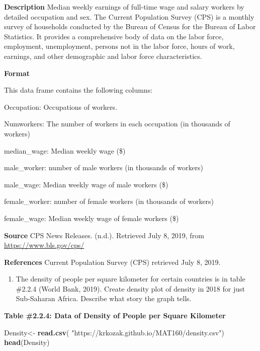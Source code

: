 \documentclass[
]{book}
\newenvironment{Shaded}{\begin{snugshade}}{\end{snugshade}}
\newcommand{\KeywordTok}[1]{\textcolor[rgb]{0.13,0.29,0.53}{\textbf{#1}}}
\newcommand{\NormalTok}[1]{#1}
\newcommand{\StringTok}[1]{\textcolor[rgb]{0.31,0.60,0.02}{#1}}
\providecommand{\tightlist}{%
  \setlength{\itemsep}{0pt}\setlength{\parskip}{0pt}}
\begin{document}
\textbf{Description}
Median weekly earnings of full-time wage and salary workers by detailed occupation and sex. The Current Population Survey (CPS) is a monthly survey of households conducted by the Bureau of Census for the Bureau of Labor Statistics. It provides a comprehensive body of data on the labor force, employment, unemployment, persons not in the labor force, hours of work, earnings, and other demographic and labor force characteristics.

\textbf{Format}

This data frame contains the following columns:

Occupation: Occupations of workers.

Numworkers: The number of workers in each occupation (in thousands of workers)

median\_wage: Median weekly wage (\$)

male\_worker: number of male workers (in thousands of workers)

male\_wage: Median weekly wage of male workers (\$)

female\_worker: number of female workers (in thousands of workers)

female\_wage: Median weekly wage of female workers (\$)

\textbf{Source}
CPS News Releases. (n.d.). Retrieved July 8, 2019, from \url{https://www.bls.gov/cps/}

\textbf{References}
Current Population Survey (CPS) retrieved July 8, 2019.

\begin{enumerate}
\def\labelenumi{\arabic{enumi}.}
\setcounter{enumi}{1}
\tightlist
\item
  The density of people per square kilometer for certain countries is in table \#2.2.4 (World Bank, 2019). Create density plot of density in 2018 for just Sub-Saharan Africa. Describe what story the graph tells.
\end{enumerate}

\textbf{Table \#2.2.4: Data of Density of People per Square Kilometer}

\begin{Shaded}
\begin{Highlighting}[]
\NormalTok{Density<-}\StringTok{ }\KeywordTok{read.csv}\NormalTok{(}
  \StringTok{"https://krkozak.github.io/MAT160/density.csv"}\NormalTok{) }
\KeywordTok{head}\NormalTok{(Density)}
\end{Highlighting}
\end{Shaded}
\end{document}
